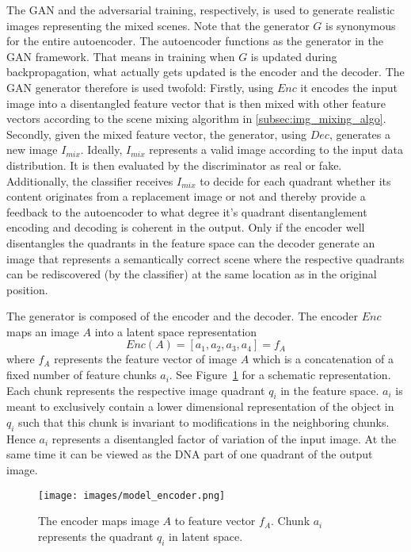 \documentclass[12pt,a4paper]{article}
\begin{document}
The GAN and the adversarial training, respectively, is used to generate realistic images representing the mixed scenes. Note that the generator $G$ is synonymous for the entire autoencoder. The autoencoder functions as the generator in the GAN framework. That means in training when $G$ is updated during backpropagation, what actually gets updated is the encoder and the decoder. The GAN generator therefore is used twofold: Firstly, using $Enc$ it encodes the input image into a disentangled feature vector that is then mixed with other feature vectors according to the scene mixing algorithm in \ref{subsec:img_mixing_algo}. Secondly, given the mixed feature vector, the generator, using $Dec$, generates a new image $I_{mix}$. Ideally, $I_{mix}$ represents a valid image according to the input data distribution. It is then evaluated by the discriminator as real or fake. Additionally, the classifier receives $I_{mix}$ to decide for each quadrant whether its content originates from a replacement image or not and thereby provide a feedback to the autoencoder to what degree it's quadrant disentanglement encoding and decoding is coherent in the output. Only if the encoder well disentangles the quadrants in the feature space can the decoder generate an image that represents a semantically correct scene where the respective quadrants can be rediscovered (by the classifier) at the same location as in the original position.

The generator is composed of the encoder and the decoder. The encoder $Enc$ maps an image $A$ into a latent space representation
\begin{equation} \label{eq:2}
    Enc(A) = [a_1, a_2, a_3, a_4] = f_A
\end{equation}
where $f_A$ represents the feature vector of image $A$ which is a concatenation of a fixed number of feature chunks $a_i$. See Figure~\ref{fig:encoder} for a schematic representation. Each chunk represents the respective image quadrant $q_i$ in the feature space. $a_i$ is meant to exclusively contain a lower dimensional representation of the object in $q_i$ such that this chunk is invariant to modifications in the neighboring chunks. Hence $a_i$ represents a disentangled factor of variation of the input image. At the same time it can be viewed as the DNA part of one quadrant of the output image.

\begin{figure}[ht]
\centering
\texttt{[image: images/model\_encoder.png]}
\caption{The encoder maps image $A$ to feature vector $f_A$. Chunk $a_i$ represents the quadrant $q_i$ in latent space.}
\label{fig:encoder}
\end{figure}
\end{document}
